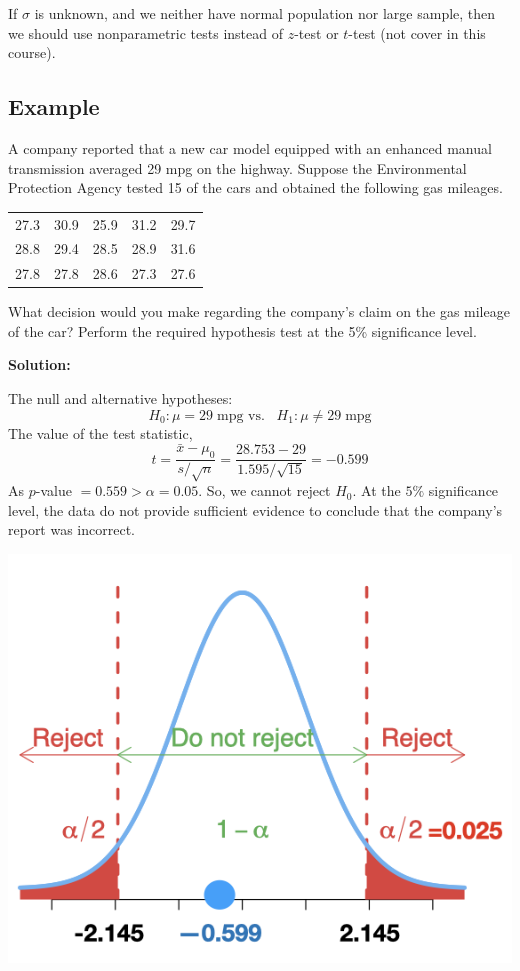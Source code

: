 \documentclass[
]{article}
\begin{document}
If \(\sigma\) is unknown, and we neither have normal population nor
large sample, then we should use nonparametric tests instead of
\(z\)-test or \(t\)-test (not cover in this course).

\hypertarget{example-3}{%
\subsection{Example}\label{example-3}}

A company reported that a new car model equipped with an enhanced manual
transmission averaged 29 mpg on the highway. Suppose the Environmental
Protection Agency tested 15 of the cars and obtained the following gas
mileages.

\begin{longtable}[]{@{}ccccc@{}}
\toprule()
\endhead
27.3 & 30.9 & 25.9 & 31.2 & 29.7 \\
28.8 & 29.4 & 28.5 & 28.9 & 31.6 \\
27.8 & 27.8 & 28.6 & 27.3 & 27.6 \\
\bottomrule()
\end{longtable}

What decision would you make regarding the company's claim on the gas
mileage of the car? Perform the required hypothesis test at the 5\%
significance level.

\textbf{Solution:}

The null and alternative hypotheses:
\[H_0: \mu =29 \;\text{mpg vs.}\;\;\; H_1: \mu \neq 29\; \text{mpg} \]
The value of the test statistic,
\[ t=\frac{\bar{x}-\mu _{0} }{s/\sqrt{n} }=\frac{28.753-29}{1.595/\sqrt{15}} =-0.599\]
As \(p\)-value \(= 0.559 > \alpha = 0.05\). So, we cannot reject
\(H_0\). At the \(5\%\) significance level, the data do not provide
sufficient evidence to conclude that the company's report was incorrect.

\begin{center}\includegraphics[width=0.9\linewidth,height=0.9\textheight]{hypoex} \end{center}
\end{document}
